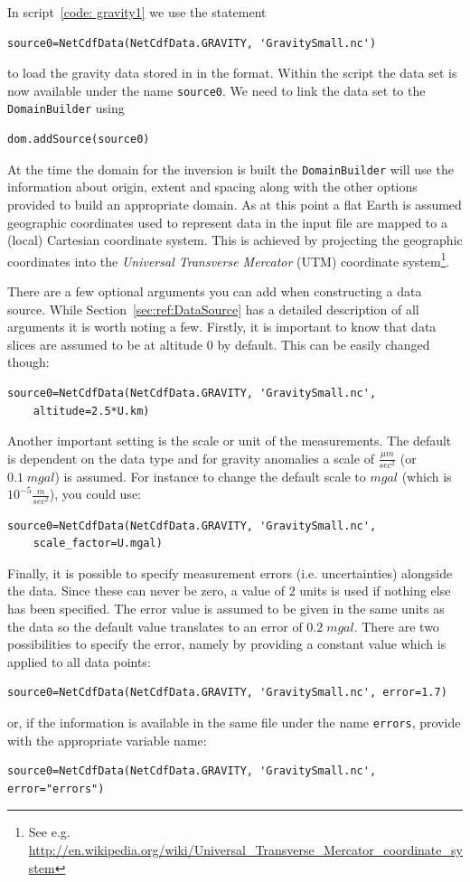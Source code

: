 In script~\ref{code: gravity1} we use the statement 
\begin{verbatim}
source0=NetCdfData(NetCdfData.GRAVITY, 'GravitySmall.nc')
\end{verbatim}
to load the gravity data stored in  in the
\netcdf format. 
Within the script the data set is now available under the name \verb|source0|.
We need to link the data set to the \verb|DomainBuilder| using 
\begin{verbatim}
dom.addSource(source0)
\end{verbatim}
At the time the domain for the inversion is built the \verb|DomainBuilder|
will use the information about origin, extent and spacing along with the other
options provided to build an appropriate domain.
As at this point a flat Earth is assumed geographic coordinates used to
represent data in the input file are mapped to a (local) Cartesian coordinate
system. This is achieved by projecting the geographic coordinates into the
\emph{Universal Transverse Mercator} (UTM) coordinate system\footnote{See e.g.
\url{http://en.wikipedia.org/wiki/Universal_Transverse_Mercator_coordinate_system}}.

There are a few optional arguments you can add when constructing a data source.
While Section~\ref{sec:ref:DataSource} has a detailed description of all
arguments it is worth noting a few.
Firstly, it is important to know that data slices are assumed to be at altitude
$0$ by default. This can be easily changed though:
\begin{verbatim}
source0=NetCdfData(NetCdfData.GRAVITY, 'GravitySmall.nc', 
    altitude=2.5*U.km)
\end{verbatim}
Another important setting is the scale or unit of the measurements.
The default is dependent on the data type and for gravity anomalies a scale
of $\frac{\mu m}{sec^2}$ (or $0.1 \; mgal$) is assumed. For instance to 
change the default scale to $mgal$ (which is $10^{-5} \frac{m}{sec^2}$),
you could use:
\begin{verbatim}
source0=NetCdfData(NetCdfData.GRAVITY, 'GravitySmall.nc', 
    scale_factor=U.mgal)
\end{verbatim}
Finally, it is possible to specify measurement errors (i.e. uncertainties)
alongside the data.
Since these can never be zero, a value of $2$ units is used if nothing else
has been specified.
The error value is assumed to be given in the same units as the data so the
default value translates to an error of $0.2 \; mgal$.
There are two possibilities to specify the error, namely by providing a
constant value which is applied to all data points:
\begin{verbatim}
source0=NetCdfData(NetCdfData.GRAVITY, 'GravitySmall.nc', error=1.7)
\end{verbatim}
or, if the information is available in the same \netcdf file under the name
\verb|errors|, provide \downunder with the appropriate variable name:
\begin{verbatim}
source0=NetCdfData(NetCdfData.GRAVITY, 'GravitySmall.nc', error="errors")
\end{verbatim}


